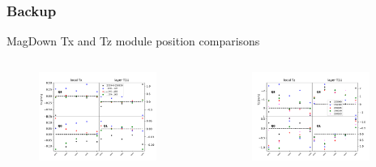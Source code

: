 \documentclass[aspectratio=1610, 12pt]{beamer}
\begin{document}
\begin{frame}\frametitle{Backup}
  MagDown Tx and Tz module position comparisons
  \begin{columns}
    \begin{column}[c]{0.48\textwidth}
      \begin{figure}
        \includegraphics[width=0.9\textwidth]{plots/stability_plots/diff_MD_T1U_Tx.pdf}
      \end{figure}
    \end{column}
      \begin{column}[c]{0.48\textwidth}
        \begin{figure}
          \includegraphics[width=0.9\textwidth]{plots/stability_plots/diff_MD_T1U_Tz.pdf}
        \end{figure}
      \end{column}
  \end{columns}
\end{frame}
\end{document}
